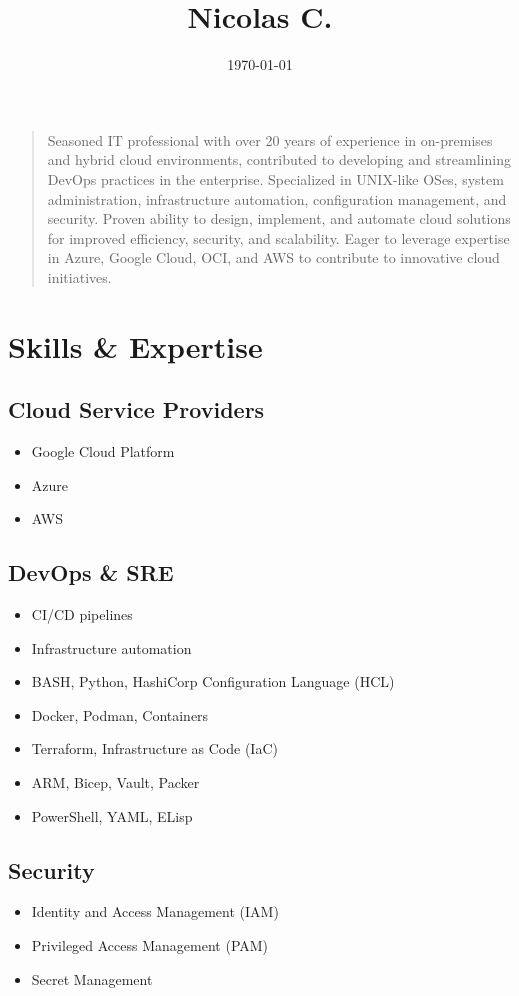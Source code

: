 \documentclass[11pt,a4paper]{article}
\date{\today}
\title{Nicolas C.}
\begin{document}
\maketitle
\begin{quote}
Seasoned IT professional with over 20 years of experience in on-premises and hybrid cloud environments, contributed to developing and streamlining DevOps practices in the enterprise. Specialized in UNIX-like OSes, system administration, infrastructure automation, configuration management, and security. Proven ability to design, implement, and automate cloud solutions for improved efficiency, security, and scalability. Eager to leverage expertise in Azure, Google Cloud, OCI, and AWS to contribute to innovative cloud initiatives.
\end{quote}
\section*{Skills \& Expertise}
\label{sec:org3c4b87d}

\subsection*{Cloud Service Providers}
\label{sec:org2b09839}
\begin{itemize}
\item Google Cloud Platform
\item Azure
\item AWS
\end{itemize}
\subsection*{DevOps \& SRE}
\label{sec:org008fac7}
\begin{itemize}
\item CI/CD pipelines
\item Infrastructure automation
\item BASH, Python, HashiCorp Configuration Language (HCL)
\item Docker, Podman, Containers
\item Terraform, Infrastructure as Code (IaC)
\item ARM, Bicep, Vault, Packer
\item PowerShell, YAML, ELisp
\end{itemize}
\subsection*{Security}
\label{sec:org35cef35}
\begin{itemize}
\item Identity and Access Management (IAM)
\item Privileged Access Management (PAM)
\item Secret Management
\end{itemize}
\end{document}
